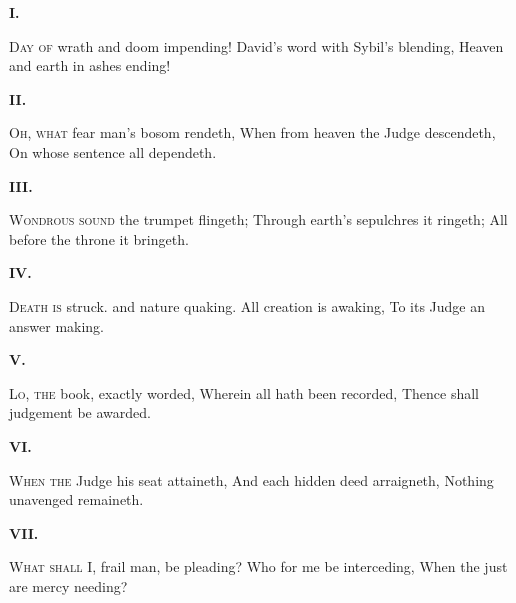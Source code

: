 \documentclass[fontsize=9, a5paper]{scrbook}
\begin{document}
\pagebreak
\begin{volumetitlepage}
	\begin{poem}
		\begin{stanza}
			\textbf{I.}\verseline
			
			\textsc{Day of} wrath and doom impending!\verseline
			David's word with Sybil's blending,\verseline
			Heaven and earth in ashes ending!
		\end{stanza}
	
		\begin{stanza}
			\textbf{II.}\verseline
			
			\textsc{Oh, what} fear man's bosom rendeth,\verseline
			When from heaven the Judge descendeth,\verseline
			On whose sentence all dependeth.
		\end{stanza}
	
		\begin{stanza}
			\textbf{III.}\verseline
			
			\textsc{Wondrous sound} the trumpet flingeth;\verseline
			Through earth's sepulchres it ringeth;\verseline
			All before the throne it bringeth.
		\end{stanza}
	
		\begin{stanza}
			\textbf{IV.}\verseline
			
			\textsc{Death is} struck. and nature quaking.\verseline
			All creation is awaking,\verseline
			To its Judge an answer making.
		\end{stanza}

		\begin{stanza}
			\textbf{V.}\verseline
			
			\textsc{Lo, the} book, exactly worded,\verseline
			Wherein all hath been recorded,\verseline
			Thence shall judgement be awarded. 
		\end{stanza}
	
		\begin{stanza}
			\textbf{VI.}\verseline
			
			\textsc{When the} Judge his seat attaineth,\verseline
			And each hidden deed arraigneth,\verseline
			Nothing unavenged remaineth. 
		\end{stanza}

		\pagebreak
	
		\begin{stanza}
			\textbf{VII.}\verseline
			
			\textsc{What shall} I, frail man, be pleading?\verseline
			Who for me be interceding,\verseline
			When the just are mercy needing? 
		\end{stanza}
	

\end{poem}
\end{volumetitlepage}
\end{document}
